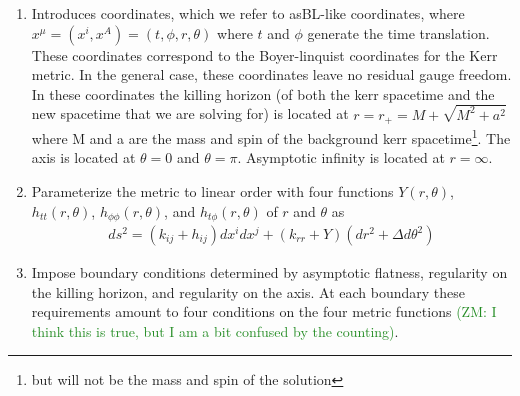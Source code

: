 \documentclass[aps,prd,amsmath,showpacs,amssymb,superscriptaddress,nofootinbib,longbibliography,eqsecnum,preprintnumbers]{revtex4-1}
\newcommand{\zach}[1]{\textcolor{ForestGreen}{#1}}
\begin{document}
\begin{enumerate}
\item Introduces coordinates, which we refer to asBL-like coordinates, where $x^\mu=(x^i,x^A)=(t,\phi,r,\theta)$ where $t$ and $\phi$ generate the time translation. These coordinates correspond to the Boyer-linquist coordinates for the Kerr metric. In the general case, these coordinates leave no residual gauge freedom. In these coordinates the killing horizon (of both the kerr spacetime and the new spacetime that we are solving for) is located at $r =r_+=M+\sqrt{M^2+a^2}$ where M and a are the mass and spin of the background kerr spacetime\footnote{but will not be the mass and spin of the solution}. The axis is located at $\theta =0$ and $\theta =\pi$. Asymptotic infinity is located at $r=\infty$.

\item Parameterize the metric to linear order with four functions $Y(r,\theta)$, $h_{tt}(r,\theta)$, $h_{\phi\phi}(r,\theta)$, and $h_{t\phi}(r,\theta)$ of $r$ and $\theta$ as
\begin{align}
ds^2=(k_{ij}+h_{ij})dx^idx^j+(k_{rr}+Y)(dr^2+\Delta d\theta^2)
\end{align}
\item Impose boundary conditions determined by asymptotic flatness, regularity on the killing horizon, and regularity on the axis. At each boundary these requirements amount to four conditions on the four metric functions \zach{(ZM: I think this is true, but I am a bit confused by the counting)}.


\end{enumerate}
\end{document}
